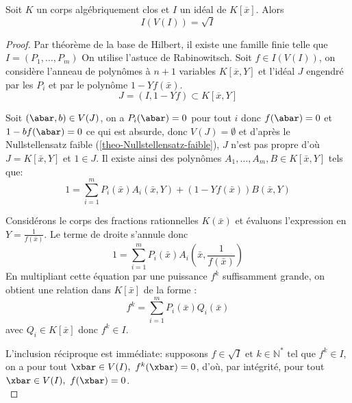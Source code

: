 \begin{theo}[Nullstellensatz]\label{theo-Nullstellensatz}
Soit $K$ un corps algébriquement clos et $I$ un idéal de $K[\overline{x}]$.
Alors \[ I(V(I)) = \sqrt{I} \] 
\end{theo}

\begin{proof}
Par théorème de la base de Hilbert, il existe une famille finie telle que $I = (P_1,\dots,P_m)$
    On utilise l'astuce de Rabinowitsch.
    Soit $f \in I(V(I))$,
    on considère l'anneau de polynômes à $n+1$ variables $K[\overline{x}, Y]$ et
    l'idéal $J$ engendré par les $P_i$ et par le polynôme $1 - Y f(\bar{x})$.
    \[ J = (I, 1 - Y f) \subset K[\overline{x}, Y] \]

    Soit $(\abar,b) \in V(J)$, on a $P_i(\abar) = 0$ pour tout $i$ donc
    $f(\abar) = 0$  et $1 - b f(\abar) = 0$ ce
    qui est absurde, donc $V(J) = \emptyset$ et d'après le Nullstellensatz
    faible (\cref{theo-Nullstellensatz-faible}), $J$ n'est pas propre d'où $J = K[\bar{x}, Y]$ et $1 \in J$.
    Il existe ainsi des polynômes $A_1, \dots, A_m, B \in K[\bar{x}, Y]$ tels que:
    \[ 1 = \sum_{i=1}^m P_i(\bar{x}) A_i(\bar{x}, Y) + (1 - Y f(\bar{x})) B(\bar{x}, Y) \]
    
    Considérons le corps des fractions rationnelles $K(\bar{x})$ et évaluons l'expression en $Y = \frac{1}{f(\bar{x})}$.
    Le terme de droite s'annule donc
    \[ 1 = \sum_{i=1}^m P_i(\bar{x}) A_i(\bar{x}, \frac{1}{f(\bar{x})}) \]
    En multipliant cette équation par une puissance $f^k$ suffisamment grande, on obtient une relation dans $K[\bar{x}]$ de la forme :
    \[ f^k = \sum_{i=1}^m P_i(\bar{x}) Q_i(\bar{x}) \]
    avec $Q_i \in K[\overline{x}]$ donc  $f^k \in I$.

L'inclusion réciproque est immédiate: supposons $f \in \sqrt{I} \text{ et } k \in \mathbb{N}^* \text{ tel que } f^k \in I$,
on a pour tout $\xbar \in V(I),\text{ }f^k(\xbar)=0$, d'où, par intégrité, pour tout $\xbar \in V(I),\text{ }f(\xbar)=0$.\\
\end{proof}
